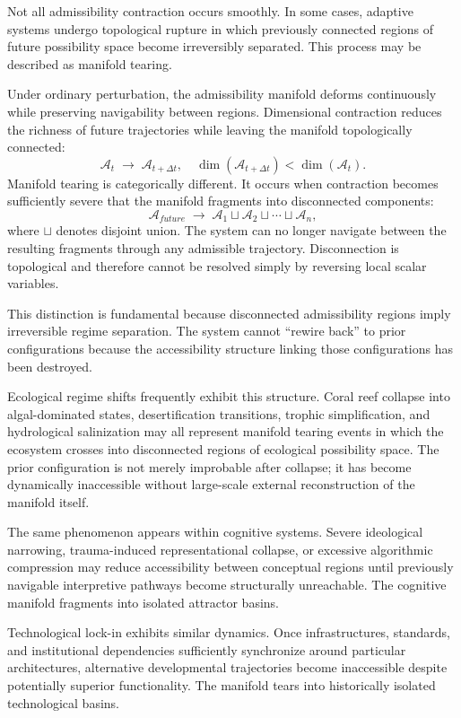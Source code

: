 \documentclass[11pt,a4paper]{article}
\newcommand{\Aspace}{\mathcal{A}}
\begin{document}
Not all admissibility contraction occurs smoothly. In some cases, adaptive systems undergo topological rupture in which previously connected regions of future possibility space become irreversibly separated. This process may be described as manifold tearing.

Under ordinary perturbation, the admissibility manifold deforms continuously while preserving navigability between regions. Dimensional contraction reduces the richness of future trajectories while leaving the manifold topologically connected:
\[
\Aspace_t \;\longrightarrow\; \Aspace_{t+\Delta t}, \quad \dim(\Aspace_{t+\Delta t}) < \dim(\Aspace_t).
\]
Manifold tearing is categorically different. It occurs when contraction becomes sufficiently severe that the manifold fragments into disconnected components:
\[
\Aspace_{future}
\;\longrightarrow\;
\Aspace_1 \sqcup \Aspace_2 \sqcup \cdots \sqcup \Aspace_n,
\]
where $\sqcup$ denotes disjoint union. The system can no longer navigate between the resulting fragments through any admissible trajectory. Disconnection is topological and therefore cannot be resolved simply by reversing local scalar variables.

This distinction is fundamental because disconnected admissibility regions imply irreversible regime separation. The system cannot ``rewire back'' to prior configurations because the accessibility structure linking those configurations has been destroyed.

Ecological regime shifts frequently exhibit this structure. Coral reef collapse into algal-dominated states, desertification transitions, trophic simplification, and hydrological salinization may all represent manifold tearing events in which the ecosystem crosses into disconnected regions of ecological possibility space. The prior configuration is not merely improbable after collapse; it has become dynamically inaccessible without large-scale external reconstruction of the manifold itself.

The same phenomenon appears within cognitive systems. Severe ideological narrowing, trauma-induced representational collapse, or excessive algorithmic compression may reduce accessibility between conceptual regions until previously navigable interpretive pathways become structurally unreachable. The cognitive manifold fragments into isolated attractor basins.

Technological lock-in exhibits similar dynamics. Once infrastructures, standards, and institutional dependencies sufficiently synchronize around particular architectures, alternative developmental trajectories become inaccessible despite potentially superior functionality. The manifold tears into historically isolated technological basins.
\end{document}
